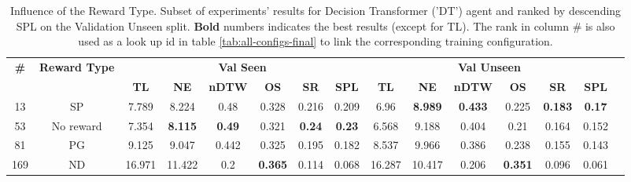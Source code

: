 \begin{table}
\centering
\caption{\label{tab:dt_reward_type}Influence of the Reward Type. Subset of experiments' results for Decision Transformer ('DT') agent and ranked by descending SPL on the Validation Unseen split. \textbf{Bold} numbers indicates the best results (except for TL). The rank in column \# is also used as a look up id in table \ref{tab:all-configs-final} to link the corresponding training configuration.}
\begin{tabular}{@{\hskip3pt}c@{\hskip3pt}c@{\hskip3pt}c@{\hskip3pt}c@{\hskip3pt}c@{\hskip3pt}c@{\hskip3pt}c@{\hskip3pt}c@{\hskip3pt}c@{\hskip3pt}c@{\hskip3pt}c@{\hskip3pt}c@{\hskip3pt}c@{\hskip3pt}c@{\hskip3pt}c}
\toprule
                                  \textbf{\#} & \textbf{Reward Type} & \multicolumn{6}{c}{\textbf{Val Seen}} & \multicolumn{6}{c}{\textbf{Val Unseen}} \\
\cmidrule(l){3-8}\cmidrule(l){9-14}\textbf{~} &           \textbf{~} &       \textbf{TL} &     \textbf{NE} &  \textbf{nDTW} &     \textbf{OS} &    \textbf{SR} &   \textbf{SPL} &         \textbf{TL} &     \textbf{NE} &   \textbf{nDTW} &     \textbf{OS} &     \textbf{SR} &   \textbf{SPL} \\
\midrule
                                           13 &                   SP &             7.789 &           8.224 &           0.48 &           0.328 &          0.216 &          0.209 &                6.96 &  \textbf{8.989} &  \textbf{0.433} &           0.225 &  \textbf{0.183} &  \textbf{0.17} \\
                                           53 &            No reward &             7.354 &  \textbf{8.115} &  \textbf{0.49} &           0.321 &  \textbf{0.24} &  \textbf{0.23} &               6.568 &           9.188 &           0.404 &            0.21 &           0.164 &          0.152 \\
                                           81 &                   PG &             9.125 &           9.047 &          0.442 &           0.325 &          0.195 &          0.182 &               8.537 &           9.966 &           0.386 &           0.238 &           0.155 &          0.143 \\
                                          169 &                   ND &            16.971 &          11.422 &            0.2 &  \textbf{0.365} &          0.114 &          0.068 &              16.287 &          10.417 &           0.206 &  \textbf{0.351} &           0.096 &          0.061 \\
\bottomrule
\end{tabular}
\end{table}
